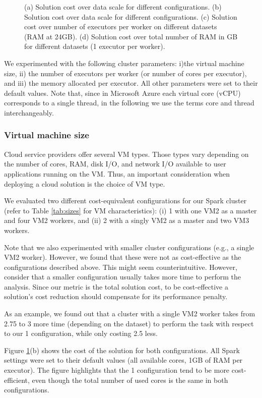 {\begin{figure}[t!]
{  }
\caption{(a) Solution cost over data scale for different \sti{} configurations. (b) Solution cost over data scale for different \sparkdi{} configurations. (c) Solution cost over number of executors per worker on different datasets (RAM at 24GB). (d) Solution cost over total number of RAM in GB for different datasets (1 executor per worker).}
\label{fig:tuning}
\end{figure}

We experimented with the following cluster parameters: i)the virtual machine size, ii) the number of executors per worker (or number of cores per executor), and iii) the memory allocated per executor.
All other parameters were set to their default values. Note that, since in Microsoft Azure each virtual core (vCPU) corresponds to a single thread, in the following we use the terms core and thread interchangeably.

\subsubsection{Virtual machine size} Cloud service providers offer several VM types. Those types vary depending on the number of cores, RAM, disk I/O, and network I/O available to user applications running on the VM. Thus, an important consideration when deploying a cloud solution is the choice of VM type.

We evaluated two different cost-equivalent configurations for our Spark cluster (refer to Table \ref{tab:sizes} for VM characteristics): (i) \sparkdi{}1 with one VM2 as a master and four VM2 workers, and (ii) \sparkdi{}2 with a singly VM2 as a master and two VM3 workers.

Note that we also experimented with smaller cluster configurations (e.g., a single VM2 worker). However, we found that these were not as cost-effective as the configurations described above. This might seem counterintuitive. However, consider that a smaller configuration usually takes more time to perform the analysis. Since our metric is the total solution cost, to be cost-effective a solution's cost reduction should compensate for its performance penalty.

As an example, we found out that a cluster with a single VM2 worker takes from 2.75 to 3 more time (depending on the dataset) to perform the task with respect to our \sparkdi{}1 configuration, while only costing 2.5 less.

Figure \ref{fig:tuning}(b) shows the cost of the solution for both configurations. All Spark settings were set to their default values (all available cores, 1GB of RAM per executor). The figure highlights that the \sparkdi{}1 configuration tend to be more cost-efficient, even though the total number of used cores is the same in both configurations.

}
